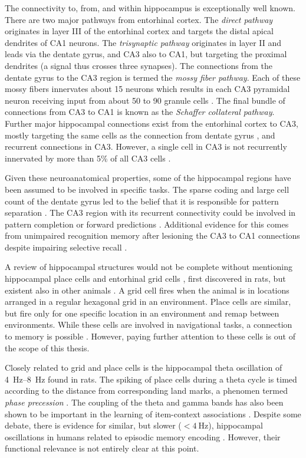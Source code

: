 The connectivity to, from, and within hippocampus is exceptionally well known.
There are two major pathways from entorhinal cortex.
The \emph{direct pathway} originates in layer III of the entorhinal cortex and targets the distal apical dendrites of CA1 neurons.
The \emph{trisynaptic pathway} originates in layer II and leads via the dentate gyrus, and CA3 also to CA1, but targeting the proximal dendrites (a signal thus crosses three synapses).
The connections from the dentate gyrus to the CA3 region is termed the \emph{mossy fiber pathway}.
Each of these mossy fibers innervates about 15 neurons \parencite{Claiborne1986} which results in each CA3 pyramidal neuron receiving input from about 50 to 90 granule cells \parencite[230]{Squire1989}.
The final bundle of connections from CA3 to CA1 is known as the \emph{Schaffer collateral pathway}.
Further major hippocampal connections exist from the entorhinal cortex to CA3, mostly targeting the same cells as the connection from dentate gyrus \parencite{Paxinos2014}, and recurrent connections in CA3.
However, a single cell in CA3 is not recurrently innervated by more than 5\% of all CA3 cells \parencite[231]{Squire1989}.

Given these neuroanatomical properties, some of the hippocampal regions have been assumed to be involved in specific tasks.
The sparse coding and large cell count of the dentate gyrus led to the belief that it is responsible for pattern separation \parencite{Rolls2013}.
The CA3 region with its recurrent connectivity could be involved in pattern completion or forward predictions \parencite{Guzowski2004,Leutgeb2007,Rolls2013}.
Additional evidence for this comes from unimpaired recognition memory after lesioning the CA3 to CA1 connections despite impairing selective recall \parencite{Brun2002}. 

A review of hippocampal structures would not be complete without mentioning hippocampal place cells and entorhinal grid cells \parencite{hafting2005}, first discovered in rats, but existent also in other animals \parencite{buzsaki2013}.
A grid cell fires when the animal is in locations arranged in a regular hexagonal grid in an environment.
Place cells are similar, but fire only for one specific location in an environment and remap between environments.
While these cells are involved in navigational tasks, a connection to memory is possible \parencite{buzsaki2013}.
However, paying further attention to these cells is out of the scope of this thesis.

Closely related to grid and place cells is the hippocampal theta oscillation of \SIrange{4}{8}{\hertz} found in rats.
The spiking of place cells during a theta cycle is timed according to the distance from corresponding land marks, a phenomen termed \emph{phase precession} \parencite{okeefe1993}.
The coupling of the theta and gamma bands has also been shown to be important in the learning of item-context associations \parencite{tort2009}.
Despite some debate, there is evidence for similar, but slower ($<\SI{4}{\hertz}$), hippocampal oscillations in humans related to episodic memory encoding \parencite{lega2012}.
However, their functional relevance is not entirely clear at this point.

